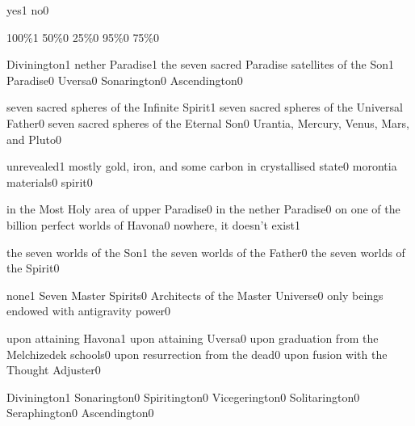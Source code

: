 {yes}{1}
{no}{0}
\qstop

{100\%}{1}
{50\%}{0}
{25\%}{0}
{95\%}{0}
{75\%}{0}
\qstop


{Divinington}{1}
{nether Paradise}{1}
{the seven sacred Paradise satellites of the Son}{1}
{Paradise}{0}
{Uversa}{0}
{Sonarington}{0}
{Ascendington}{0}
\qstop

{seven sacred spheres of the Infinite Spirit}{1}
{seven sacred spheres of the Universal Father}{0}
{seven sacred spheres of the Eternal Son}{0}
{Urantia, Mercury, Venus, Mars, and Pluto}{0}
\qstop

{unrevealed}{1}
{mostly gold, iron, and some carbon in crystallised state}{0}
{morontia materials}{0}
{spirit}{0}
\qstop

{in the Most Holy area of upper Paradise}{0}
{in the nether Paradise}{0}
{on one of the billion perfect worlds of Havona}{0}
{nowhere, it doesn't exist}{1}
\qstop

{the seven worlds of the Son}{1}
{the seven worlds of the Father}{0}
{the seven worlds of the Spirit}{0}
\qstop

{none}{1}
{Seven Master Spirits}{0}
{Architects of the Master Universe}{0}
{only beings endowed with antigravity power}{0}
\qstop

{upon attaining Havona}{1}
{upon attaining Uversa}{0}
{upon graduation from the Melchizedek schools}{0}
{upon resurrection from the dead}{0}
{upon fusion with the Thought Adjuster}{0}
\qstop

{Divinington}{1}
{Sonarington}{0}
{Spiritington}{0}
{Vicegerington}{0}
{Solitarington}{0}
{Seraphington}{0}
{Ascendington}{0}
\qstop

